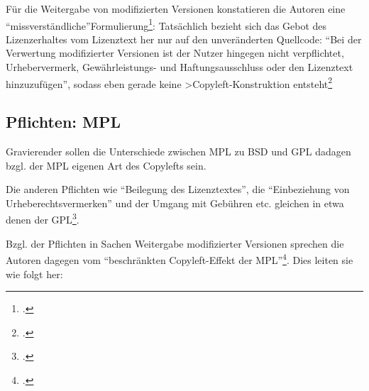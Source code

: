 \documentclass[DIV=calc,BCOR=5mm,11pt,headings=small,oneside,abstract=true, toc=bib]{scrartcl}
\begin{document}
Für die Weitergabe von modifizierten Versionen konstatieren die Autoren eine
\enquote{missverständliche}Formulierung\footcite[vgl.][343]{ArlBriVol2004a}:
Tatsächlich bezieht sich das Gebot des Lizenzerhaltes vom Lizenztext her nur auf
den unveränderten Quellcode: \enquote{Bei der Verwertung modifizierter
Versionen ist der Nutzer hingegen nicht verpflichtet, Urhebervermerk,
Gewährleistungs- und Haftungsausschluss oder den Lizenztext hinzuzufügen},
sodass eben gerade keine >Copyleft-Konstruktion
entsteht\footcite[vgl.][344]{ArlBriVol2004a}

\subsection{Pflichten: MPL}

Gravierender sollen die Unterschiede zwischen MPL zu BSD und GPL dadagen bzgl.
der MPL eigenen Art des Copylefts sein.

Die anderen Pflichten wie \enquote{Beilegung des Lizenztextes}, die
\enquote{Einbeziehung von Urheberechtsvermerken} und der Umgang mit Gebühren
etc. gleichen in etwa denen der GPL\footcite[vgl.][346f]{ArlBriVol2004a}.

Bzgl. der Pflichten in Sachen Weitergabe modifizierter Versionen sprechen die
Autoren dagegen vom \enquote{beschränkten Copyleft-Effekt der
MPL}\footcite[vgl.][348]{ArlBriVol2004a}. Dies leiten sie wie folgt her:
\end{document}
